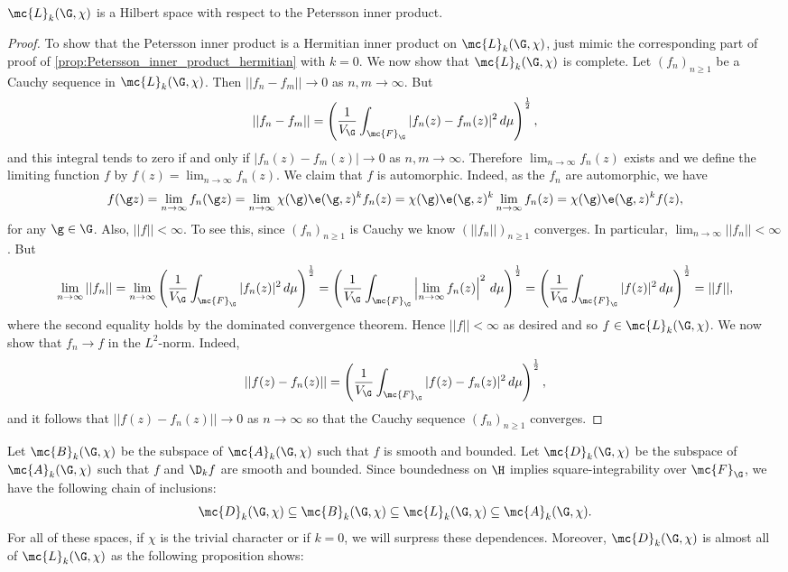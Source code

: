     \begin{proposition}
      $\mc{L}_{k}(\G,\chi)$ is a Hilbert space with respect to the Petersson inner product.
    \end{proposition}
    \begin{proof}
      To show that the Petersson inner product is a Hermitian inner product on $\mc{L}_{k}(\G,\chi)$, just mimic the corresponding part of proof of \cref{prop:Petersson_inner_product_hermitian} with $k = 0$. We now show that $\mc{L}_{k}(\G,\chi)$ is complete. Let $(f_{n})_{n \ge 1}$ be a Cauchy sequence in $\mc{L}_{k}(\G,\chi)$. Then $||f_{n}-f_{m}|| \to 0$ as $n,m \to \infty$. But
      \[
        ||f_{n}-f_{m}|| = \left(\frac{1}{V_{\G}}\int_{\mc{F}_{\G}}|f_{n}(z)-f_{m}(z)|^{2}\,d\mu\right)^{\frac{1}{2}},
      \]
      and this integral tends to zero if and only if $|f_{n}(z)-f_{m}(z)| \to 0$ as $n,m \to \infty$. Therefore $\lim_{n \to \infty}f_{n}(z)$ exists and we define the limiting function $f$ by $f(z) = \lim_{n \to \infty}f_{n}(z)$. We claim that $f$ is automorphic. Indeed, as the $f_{n}$ are automorphic, we have
      \[
        f(\g z) = \lim_{n \to \infty}f_{n}(\g z) = \lim_{n \to \infty}\chi(\g)\e(\g,z)^{k}f_{n}(z) = \chi(\g)\e(\g,z)^{k}\lim_{n \to \infty}f_{n}(z) = \chi(\g)\e(\g,z)^{k}f(z),
      \]
      for any $\g \in \G$. Also, $||f|| < \infty$. To see this, since $(f_{n})_{n \ge 1}$ is Cauchy we know $(||f_{n}||)_{n \ge 1}$ converges. In particular, $\lim_{n \to \infty}||f_{n}|| < \infty$. But
      \[
        \lim_{n \to \infty}||f_{n}|| = \lim_{n \to \infty}\left(\frac{1}{V_{\G}}\int_{\mc{F}_{\G}}|f_{n}(z)|^{2}\,d\mu\right)^{\frac{1}{2}} = \left(\frac{1}{V_{\G}}\int_{\mc{F}_{\G}}\left|\lim_{n \to \infty}f_{n}(z)\right|^{2}\,d\mu\right)^{\frac{1}{2}} = \left(\frac{1}{V_{\G}}\int_{\mc{F}_{\G}}|f(z)|^{2}\,d\mu\right)^{\frac{1}{2}} = ||f||,
      \]
      where the second equality holds by the dominated convergence theorem. Hence $||f|| < \infty$ as desired and so $f \in \mc{L}_{k}(\G,\chi)$. We now show that $f_{n} \to f$ in the $L^{2}$-norm. Indeed,
      \[
        ||f(z)-f_{n}(z)|| = \left(\frac{1}{V_{\G}}\int_{\mc{F}_{\G}}|f(z)-f_{n}(z)|^{2}\,d\mu\right)^{\frac{1}{2}},
      \]
      and it follows that $||f(z)-f_{n}(z)|| \to 0$ as $n \to \infty$ so that the Cauchy sequence $(f_{n})_{n \ge 1}$ converges.
    \end{proof}

    Let $\mc{B}_{k}(\G,\chi)$ be the subspace of $\mc{A}_{k}(\G,\chi)$ such that $f$ is smooth and bounded. Let $\mc{D}_{k}(\G,\chi)$ be the subspace of $\mc{A}_{k}(\G,\chi)$ such that $f$ and $\D_{k}f$ are smooth and bounded. Since boundedness on $\H$ implies square-integrability over $\mc{F}_{\G}$, we have the following chain of inclusions:
    \[
      \mc{D}_{k}(\G,\chi) \subseteq \mc{B}_{k}(\G,\chi) \subseteq \mc{L}_{k}(\G,\chi) \subseteq \mc{A}_{k}(\G,\chi).
    \]
    For all of these spaces, if $\chi$ is the trivial character or if $k = 0$, we will surpress these dependences. Moreover, $\mc{D}_{k}(\G,\chi)$ is almost all of $\mc{L}_{k}(\G,\chi)$ as the following proposition shows:

